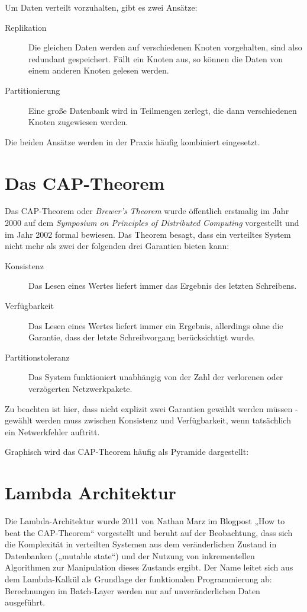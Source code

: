 \documentclass[a4paper,11pt]{scrartcl}
\begin{document}
  Um Daten verteilt vorzuhalten, gibt es zwei Ansätze:

  \begin{description}
    \item[Replikation] Die gleichen Daten werden auf verschiedenen Knoten
      vorgehalten, sind also redundant gespeichert. Fällt ein Knoten aus, so
      können die Daten von einem anderen Knoten gelesen werden.
    \item[Partitionierung] Eine große Datenbank wird in Teilmengen zerlegt, die
      dann verschiedenen Knoten zugewiesen werden.
  \end{description}

  Die beiden Ansätze werden in der Praxis häufig kombiniert eingesetzt.

  \section{Das CAP-Theorem}
  Das CAP-Theorem oder \textit{Brewer's Theorem} wurde öffentlich erstmalig im
  Jahr 2000 auf dem \textit{Symposium on Principles of Distributed Computing}
  vorgestellt und im Jahr 2002 formal bewiesen. Das Theorem besagt, dass ein
  verteiltes System nicht mehr als zwei der folgenden drei Garantien bieten kann:

  \begin{description}
    \item[Konsistenz] Das Lesen eines Wertes liefert immer das Ergebnis des
      letzten Schreibens.
    \item[Verfügbarkeit] Das Lesen eines Wertes liefert immer ein Ergebnis,
      allerdings ohne die Garantie, dass der letzte Schreibvorgang berücksichtigt
      wurde.
    \item[Partitionstoleranz] Das System funktioniert unabhängig von der Zahl der
      verlorenen oder verzögerten Netzwerkpakete.
  \end{description}

  Zu beachten ist hier, dass nicht explizit zwei Garantien gewählt werden müssen
  - gewählt werden muss zwischen Konsistenz und Verfügbarkeit, wenn tatsächlich
  ein Netwerkfehler auftritt.

  Graphisch wird das CAP-Theorem häufig als Pyramide dargestellt:


  \section{Lambda Architektur}
  Die Lambda-Architektur wurde 2011 von Nathan Marz im Blogpost „How
  to beat the CAP-Theorem“ vorgestellt und beruht auf der Beobachtung,
  dass sich die Komplexität in verteilten Systemen aus dem
  veränderlichen Zustand in Datenbanken („mutable state“) und der
  Nutzung von inkrementellen Algorithmen zur Manipulation dieses
  Zustands ergibt.  Der Name leitet sich aus dem Lambda-Kalkül als
  Grundlage der funktionalen Programmierung ab: Berechnungen im
  Batch-Layer werden nur auf unveränderlichen Daten ausgeführt.
\end{document}
